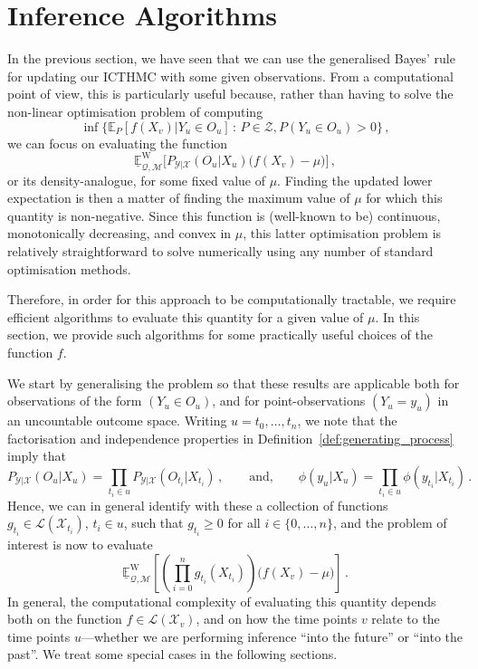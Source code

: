 \documentclass[twoside,11pt]{article}
\newcommand{\states}{\mathcal{X}}
\newcommand{\observs}{\mathcal{Y}}
\newcommand{\lexp}{\underline{\mathbb{E}}_{\rateset,\mathcal{M}}^\mathrm{W}}
\newcommand{\gambles}{\mathcal{L}}
\newcommand{\rateset}{\mathcal{Q}}
\begin{document}
\section{Inference Algorithms}\label{sec:inference_algos}

In the previous section, we have seen that we can use the generalised Bayes' rule for updating our ICTHMC with some given observations. From a computational point of view, this is particularly useful because, rather than having to solve the non-linear optimisation problem of computing
\begin{equation*}
\inf\bigl\{\mathbb{E}_P[f(X_v)\vert Y_u\in O_u]\,:\, P\in\mathcal{Z},P(Y_u\in O_u)>0\bigr\}\,,
\end{equation*}
we can focus on evaluating the function
\begin{equation*}
\lexp\bigl[P_{\observs\vert\states}(O_u\vert X_u)\bigl(f(X_v) - \mu\bigr)\bigr]\,,
\end{equation*}
or its density-analogue, for some fixed value of $\mu$. Finding the updated lower expectation is then a matter of finding the maximum value of $\mu$ for which this quantity is non-negative. Since this function is (well-known to be) continuous, monotonically decreasing, and convex in $\mu$, this latter optimisation problem is relatively straightforward to solve numerically using any number of standard optimisation methods.

Therefore, in order for this approach to be computationally tractable, we require efficient algorithms to evaluate this quantity for a given value of $\mu$. In this section, we provide such algorithms for some practically useful choices of the function $f$.

We start by generalising the problem so that these results are applicable both for observations of the form $(Y_u\in O_u)$, and for point-observations $(Y_u=y_u)$ in an uncountable outcome space. Writing $u=t_0,\ldots,t_n$, we note that the factorisation and independence properties in Definition~\ref{def:generating_process} imply that
\begin{equation*}
P_{\observs\vert\states}(O_u\vert X_u) = \prod_{t_i\in u}P_{\observs\vert\states}(O_{t_i}\vert X_{t_i})\,,\quad\quad\text{and,}\quad\quad \phi(y_u\vert X_u) = \prod_{t_i\in u}\phi(y_{t_i}\vert X_{t_i})\,.
\end{equation*}
Hence, we can in general identify with these a collection of functions $g_{t_i}\in\gambles(\states_{t_i})$, $t_i\in u$, such that $g_{t_i}\geq 0$ for all $i\in\{0,\ldots,n\}$, and the problem of interest is now to evaluate
\begin{equation*}
\lexp\left[ \left(\prod_{i=0}^ng_{t_i}(X_{t_i})\right)\bigl(f(X_v) - \mu\bigr) \right]\,.
\end{equation*}
In general, the computational complexity of evaluating this quantity depends both on the function $f\in\gambles(\states_v)$, and on how the time points $v$ relate to the time points $u$---whether we are performing inference ``into the future'' or ``into the past''. We treat some special cases in the following sections.
\end{document}
